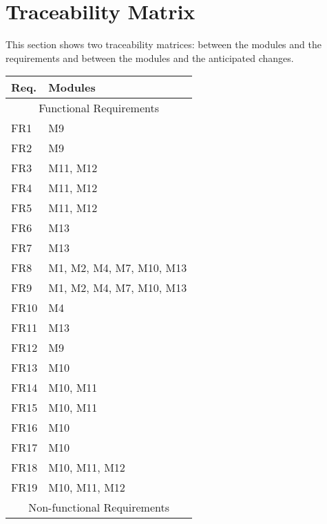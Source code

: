 \documentclass[12pt, titlepage]{article}
\begin{document}
\section{Traceability Matrix} \label{SecTM}

This section shows two traceability matrices: between the modules and the
requirements and between the modules and the anticipated changes.

\begin{table}[H]
\centering
\begin{tabular}{p{} p{}}
\toprule
\textbf{Req.} & \textbf{Modules}\\
\midrule
\multicolumn{2}{c}{Functional Requirements} \\
\midrule
FR1 & M9\\
FR2 & M9\\
FR3 & M11, M12\\
FR4 & M11, M12\\
FR5 & M11, M12\\
FR6 & M13\\
FR7 & M13\\
FR8 &  M1, M2, M4, M7, M10, M13\\
FR9 &  M1, M2, M4, M7, M10, M13\\
FR10 & M4\\
FR11 & M13\\
FR12 & M9\\
FR13 & M10\\
FR14 & M10, M11\\
FR15 & M10, M11\\
FR16 & M10\\
FR17 & M10\\
FR18 & M10, M11, M12\\
FR19 & M10, M11, M12\\

\midrule
\multicolumn{2}{c}{Non-functional Requirements}\\
\midrule


\end{tabular}
\end{table}
\end{document}

